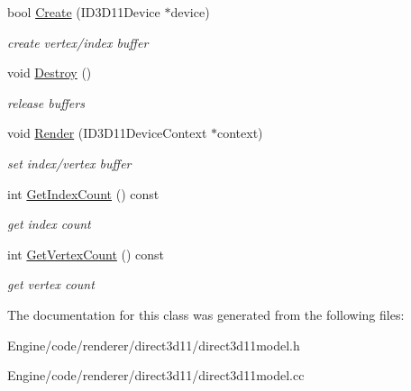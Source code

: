 \begin{DoxyCompactItemize}
bool \mbox{\hyperlink{class_direct3_d11_1_1_direct3_d11_model_aaac19e83b44fb3c99efdc55306eaf977}{Create}} (I\+D3\+D11\+Device $\ast$device)
\begin{DoxyCompactList}\small\item\em create vertex/index buffer \end{DoxyCompactList}\item 
\mbox{\label{class_direct3_d11_1_1_direct3_d11_model_a9e9944cf4bae2169ed5d73129798b070}} 
void \mbox{\hyperlink{class_direct3_d11_1_1_direct3_d11_model_a9e9944cf4bae2169ed5d73129798b070}{Destroy}} ()
\begin{DoxyCompactList}\small\item\em release buffers \end{DoxyCompactList}\item 
\mbox{\label{class_direct3_d11_1_1_direct3_d11_model_ad980585fb066772a89f6c3974d721130}} 
void \mbox{\hyperlink{class_direct3_d11_1_1_direct3_d11_model_ad980585fb066772a89f6c3974d721130}{Render}} (I\+D3\+D11\+Device\+Context $\ast$context)
\begin{DoxyCompactList}\small\item\em set index/vertex buffer \end{DoxyCompactList}\item 
\mbox{\label{class_direct3_d11_1_1_direct3_d11_model_a9a3e2bcae2488dfe888b3eff18977dab}} 
int \mbox{\hyperlink{class_direct3_d11_1_1_direct3_d11_model_a9a3e2bcae2488dfe888b3eff18977dab}{Get\+Index\+Count}} () const
\begin{DoxyCompactList}\small\item\em get index count \end{DoxyCompactList}\item 
\mbox{\label{class_direct3_d11_1_1_direct3_d11_model_a95da4bf3c8c3af263d7a1b8026e0e49e}} 
int \mbox{\hyperlink{class_direct3_d11_1_1_direct3_d11_model_a95da4bf3c8c3af263d7a1b8026e0e49e}{Get\+Vertex\+Count}} () const
\begin{DoxyCompactList}\small\item\em get vertex count \end{DoxyCompactList}\end{DoxyCompactItemize}


The documentation for this class was generated from the following files\+:\begin{DoxyCompactItemize}
\item 
Engine/code/renderer/direct3d11/direct3d11model.\+h\item 
Engine/code/renderer/direct3d11/direct3d11model.\+cc\end{DoxyCompactItemize}
